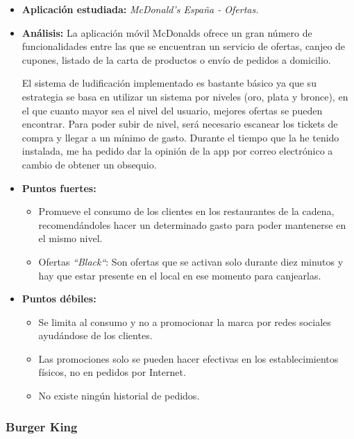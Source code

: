 \documentclass[twoside]{report}
\begin{document}
\begin{itemize}
\item \textbf{Aplicación estudiada:} \cite{mcdo} \textit{McDonald's España - Ofertas.}
\item \textbf{Análisis:} 
La aplicación móvil McDonalds ofrece un gran número de funcionalidades entre las que se encuentran un servicio de ofertas, canjeo de cupones, listado de la carta de productos o envío de pedidos a domicilio. 

El sistema de ludificación implementado es bastante básico ya que su estrategia se basa en utilizar un sistema por niveles (oro, plata y bronce), en el que cuanto mayor sea el nivel del usuario, mejores ofertas se pueden encontrar. Para poder subir de nivel, será necesario escanear los tickets de compra y llegar a un mínimo de gasto. Durante el tiempo que la he tenido instalada, me ha pedido dar la opinión de la app por correo electrónico a cambio de obtener un obsequio.

\item \textbf{Puntos fuertes:}
	\begin{itemize}
	\item Promueve el consumo de los clientes en los restaurantes de la cadena, recomendándoles hacer un determinado gasto para poder mantenerse en el mismo nivel.
	\item Ofertas \textit{“Black“}: Son ofertas que se activan solo durante diez minutos y hay que estar presente en el local en ese momento para canjearlas.
	\end{itemize}
\item \textbf{Puntos débiles:}
	\begin{itemize}
	\item Se limita al consumo y no a promocionar la marca por redes sociales ayudándose de los clientes.
	\item Las promociones solo se pueden hacer efectivas en los establecimientos físicos, no en pedidos por Internet.
	\item No existe ningún historial de pedidos.
	\end{itemize}
\end{itemize}


\subsubsection{Burger King}
\end{document}

